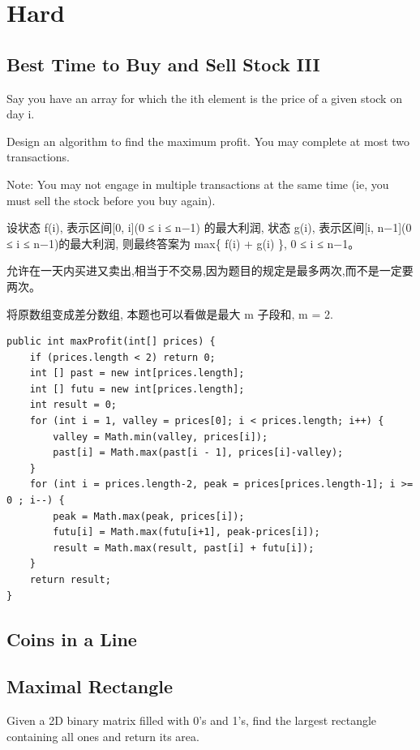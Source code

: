 \documentclass[12pt]{book}
\begin{document}
\section{Hard}
\label{sec-14-3}
\subsection{Best Time to Buy and Sell Stock III}
\label{sec-14-3-1}
Say you have an array for which the ith element is the price of a given stock on day i.

Design an algorithm to find the maximum profit. You may complete at most two transactions.

Note: You may not engage in multiple transactions at the same time (ie, you must sell the stock before you buy again).

设状态 f(i), 表示区间[0, i](0 ≤ i ≤ n−1) 的最大利润, 状态 g(i), 表示区间[i, n−1](0 ≤ i ≤ n−1)的最大利润, 则最终答案为 max\{ f(i) + g(i) \}, 0 ≤ i ≤ n−1。

允许在一天内买进又卖出,相当于不交易,因为题目的规定是最多两次,而不是一定要两次。

将原数组变成差分数组, 本题也可以看做是最大 m 子段和, m = 2.

\lstset{language=java,label= ,caption= ,numbers=none}
\begin{lstlisting}
public int maxProfit(int[] prices) {
    if (prices.length < 2) return 0; 
    int [] past = new int[prices.length];
    int [] futu = new int[prices.length];
    int result = 0;
    for (int i = 1, valley = prices[0]; i < prices.length; i++) {
        valley = Math.min(valley, prices[i]);
        past[i] = Math.max(past[i - 1], prices[i]-valley);
    }
    for (int i = prices.length-2, peak = prices[prices.length-1]; i >= 0 ; i--) {
        peak = Math.max(peak, prices[i]);
        futu[i] = Math.max(futu[i+1], peak-prices[i]);
        result = Math.max(result, past[i] + futu[i]);
    }
    return result;
}
\end{lstlisting}

\subsection{Coins in a Line}
\label{sec-14-3-2}

\subsection{Maximal Rectangle}
\label{sec-14-3-3}
Given a 2D binary matrix filled with 0's and 1's, find the largest rectangle containing all ones and return its area.
\end{document}
